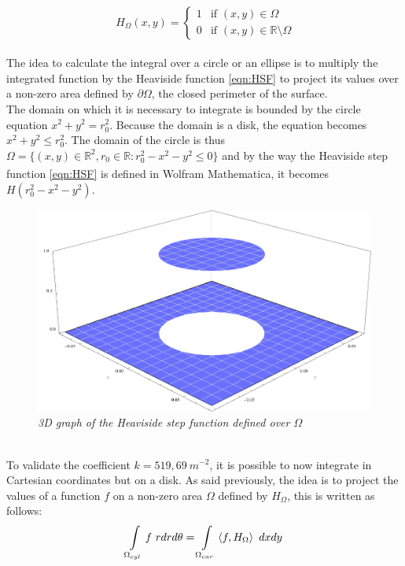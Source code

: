 \\
\begin{equation}
     \ H_{\Omega}(x,y) =
    \begin{cases}
        1 & \text{if } (x,y) \in \Omega\\
        0 & \text{if } (x,y) \in \mathbb{R}\setminus\Omega
    \end{cases}
    \label{eqn:HSF}
\end{equation}
\\
\normalsize{\indent The idea to calculate the integral over a circle or an ellipse is to multiply the integrated function by the Heaviside function \eqref{eqn:HSF} to project its values over a non-zero area defined by $\partial \Omega$, the closed perimeter of the surface.}
\\
\break
\normalsize{\indent The domain on which it is necessary to integrate is bounded by the circle equation $x^2 + y^2 = r_0^2$. Because the domain is a disk, the equation becomes $x^2 + y^2 \leq r_0^2$. The domain of the circle is thus $\Omega = \{ (x,y) \in \mathbb{R}^2, r_0 \in \mathbb{R} : r_0^2 - x^2 - y^2 \leq 0 \}$ and by the way the Heaviside step function \eqref{eqn:HSF} is defined in Wolfram Mathematica\textsuperscript{\textregistered}, it becomes $H(r_0^2 - x^2 - y^2)$.}
\\
\begin{figure}[h!] 
    \centering
    \includegraphics[width=.7\textwidth]{figures/stepfunction.png}
    \caption{\it 3D graph of the Heaviside step function defined over $\Omega$}
    \label{fig:fig_4_2}
\end{figure}
\\
\normalsize{\indent To validate the coefficient $k=519,69 \ m^{-2}$, it is possible to now integrate in Cartesian coordinates but on a disk. As said previously, the idea is to project the values of a function $f$ on a non-zero area $\Omega$ defined by $H_\Omega$, this is written as follows:}
\\
\begin{equation}
    \int\displaylimits_{\Omega_{cyl}} f \ rdrd\theta = \int\displaylimits_{\Omega_{car}} \proj{f}{H_\Omega} \ dxdy
\end{equation}
